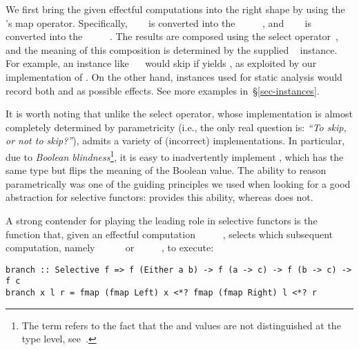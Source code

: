 {\noindent
We first bring the given effectful computations into the right shape by using
the 's map operator. Specifically, ~\hs{::}~~
is converted into the ~\hs{::}~~~\hs{()}~\hs{())},
and ~\hs{::}~~\hs{()} is converted into the
~\hs{::}~~\hs{(()}~\hs{->}~\hs{())}. The results are composed
using the select operator~, and the meaning of this composition is
determined by the supplied ~ instance. For example, an
instance like ~\hs{=}~ would skip  if  yields
, as exploited by our implementation of . On the other
hand, instances used for static analysis would record both  and  as
possible effects. See more examples in~\S\ref{sec-instances}.

It is worth noting that unlike the select operator, whose implementation is
almost completely determined by parametricity (i.e., the only real question is:
\emph{``To skip, or not to skip?''}),  admits a variety of (incorrect)
implementations. In particular, due to \emph{Boolean blindness}\footnote{The
term refers to the fact that the  and  values are not
distinguished at the type level, see~\citet{boolean-blindness}.},
it is easy to inadvertently implement , which has the same type but
flips the meaning of the Boolean value. The ability to reason parametrically was
one of the guiding principles we used when looking for a good abstraction for
selective functors:  provides this ability, whereas  does
not.


A strong contender for playing the leading role in selective functors is the
function  that, given an effectful computation
~\hs{::}~~~~, selects which subsequent
computation, namely ~\hs{::}~~\hs{(}~\hs{->}~ or
~\hs{::}~~\hs{(}~\hs{->}~, to execute:

\vspace{1mm}
\begin{verbatim}
branch :: Selective f => f (Either a b) -> f (a -> c) -> f (b -> c) -> f c
branch x l r = fmap (fmap Left) x <*? fmap (fmap Right) l <*? r
\end{verbatim}
\vspace{1mm}

}
